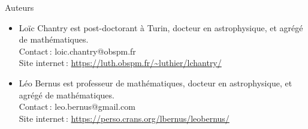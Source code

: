 \newpage

\thispagestyle{empty}

\vspace{5cm}



\begin{centering}

\vspace{5cm}

    
\end{centering}


\vfill

{\Large Auteurs}

\begin{itemize}[$\bullet$]
    \item  Loïc Chantry est post-doctorant à Turin, docteur en astrophysique, et agrégé de mathématiques.\\Contact\,: loic.chantry@obspm.fr \\ Site internet\,: \url{https://luth.obspm.fr/~luthier/lchantry/}
    \item Léo Bernus est professeur de mathématiques, docteur en astrophysique, et agrégé de mathématiques. \\Contact\,: leo.bernus@gmail.com \\ Site internet\,: \url{https://perso.crans.org/lbernus/leobernus/}
\end{itemize}

\newpage
